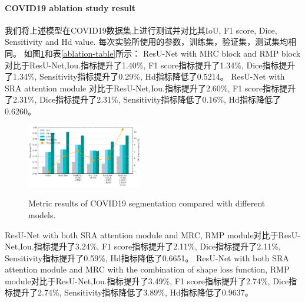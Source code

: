 \documentclass{ieeeaccess}
\begin{document}
  \paragraph{COVID19 ablation study result}
  我们将上述模型在COVID19数据集上进行测试并对比其IoU, F1 score, Dice, Sensitivity and Hd value. 每次实验所使用的参数，训练集，验证集，测试集均相同。
  如图\ref{fig:covid_comparison}和表\ref{ablation-table}所示：
  ResU-Net with MRC block and RMP block 对比于ResU-Net,Iou.指标提升了1.40\%, F1 score指标提升了1.34\%, Dice指标提升了1.34\%, Sensitivity指标提升了0.29\%, Hd指标降低了0.5214。
  ResU-Net with SRA attention module 对比于ResU-Net,Iou.指标提升了2.60\%, F1 score指标提升了2.31\%, Dice指标提升了2.31\%, Sensitivity指标降低了0.16\%, Hd指标降低了0.6260。
  \begin{figure}[htbp]
    \begin{center}
    \includegraphics[width=0.45\textwidth]{figure/covid_comparison.pdf}
    \vspace{-2mm}
    \caption{Metric results of COVID19 segmentation compared with different models.} 
    \vspace{-2mm}
    \label{fig:covid_comparison}
    \end{center}
    \vspace{-0.35cm}
  \end{figure}
  ResU-Net with both SRA attention module and MRC, RMP module对比于ResU-Net,Iou.指标提升了3.24\%, F1 score指标提升了2.11\%, Dice指标提升了2.11\%, Sensitivity指标提升了0.59\%, Hd指标降低了0.6651。
  ResU-Net with both SRA attention module and MRC with the combination of shape loss function, 
  RMP module对比于ResU-Net,Iou.指标提升了3.49\%, F1 score指标提升了2.74\%, Dice指标提升了2.74\%, Sensitivity指标降低了3.89\%, Hd指标降低了0.9637。
  
\end{document}
